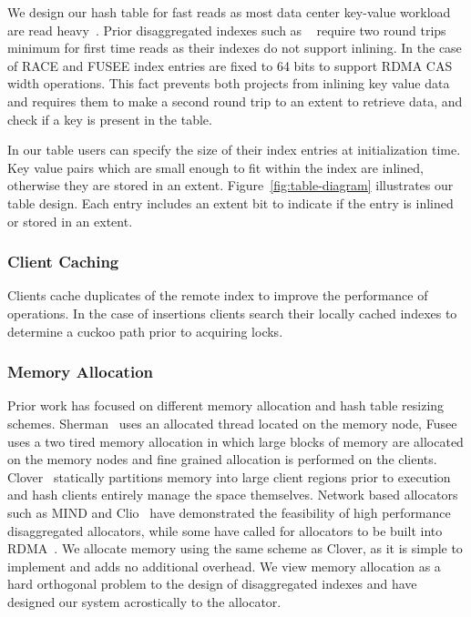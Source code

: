 We design our hash table for fast reads as most data center
key-value workload are read heavy~\cite{facebook-memcached}.
Prior disaggregated indexes such as
~\cite{clover,race,fusee} require two round trips minimum
for first time reads as their indexes do not support
inlining. In the case of RACE and FUSEE index entries are
fixed to 64 bits to support RDMA CAS width operations. This
fact prevents both projects from inlining key value data and
requires them to make a second round trip to an extent to
retrieve data, and check if a key is present in the table.

In our table users can specify the size of their index entries at
initialization time. Key value pairs which are small enough
to fit within the index are inlined, otherwise they are
stored in an extent. Figure~\ref{fig:table-diagram}
illustrates our table design. Each entry includes an extent
bit to indicate if the entry is inlined or stored in an
extent.

\subsubsection{Client Caching}

 Clients cache duplicates of the remote index
to improve the performance of operations. In the case of
insertions clients search their locally cached indexes to
determine a cuckoo path prior to acquiring locks. 

\subsubsection{Memory Allocation}

Prior work has focused on different memory allocation and
hash table resizing schemes. Sherman~\cite{sherman} uses an
allocated thread located on the memory node,
Fusee~\cite{fusee} uses a two tired memory allocation in
which large blocks of memory are allocated on the memory
nodes and fine grained allocation is performed on the
clients. Clover~\cite{clover} statically partitions memory
into large client regions prior to execution and hash
clients entirely manage the space themselves. Network based
allocators such as MIND and Clio~\cite{mind,clio} have
demonstrated the feasibility of high performance
disaggregated allocators, while some have called for
allocators to be built into RDMA~\cite{prism}. We allocate
memory using the same scheme as Clover, as it is simple to
implement and adds no additional overhead. We view memory
allocation as a hard orthogonal problem to the design of
disaggregated indexes and have designed our system
acrostically to the allocator.




